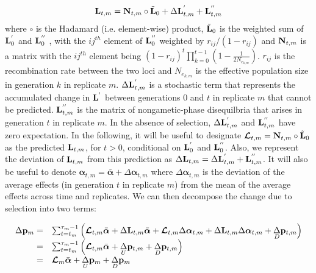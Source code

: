 \documentclass[12pt]{article}
\begin{document}
\begin{bibunit}
\begin{equation}
{\bf L}_{t,m}= {\bf N}_{t,m}\circ\tilde{\bf L}_{0}+\Delta{\bf L}^{'}_{t,m}+{\bf L}^{''}_{t,m}
\label{Eq:LD_dynamics}
\end{equation}
where $\circ$ is the Hadamard (i.e. element-wise) product, $\tilde{\bf L}_{0}$ is the weighted sum of ${\bf L}^{'}_{0}$ and ${\bf L}^{''}_{0}$ , with the $ij^{th}$ element of ${\bf L}^{''}_{0}$ weighted by $r_{ij}/(1-r_{ij})$ and ${\bf N}_{t,m}$ is a matrix with the $ij^{th}$ element being $(1-r_{ij})^{t}\prod_{k=0}^{t-1}(1-\frac{1}{2N_{e_{k,m}}})$. $r_{ij}$ is the recombination rate between the two loci and  $N_{e_{k,m}}$ is the effective population size in generation $k$ in replicate $m$. $\Delta {\bf L}^{'}_{t,m}$ is a stochastic term that represents the accumulated change in ${\bf L}^{'}$ between generations 0 and $t$ in replicate $m$ that cannot be predicted. ${\bf L}^{''}_{t,m}$ is the matrix of nongametic-phase disequilbria that arises in generation $t$ in replicate $m$. In the absence of selection, $\Delta {\bf L}^{'}_{t,m}$ and ${\bf L}^{''}_{t,m}$ have zero expectation. In the following, it will be useful to designate $\boldsymbol{\mathcal{L}}_{t,m} = {\bf N}_{t,m}\circ\tilde{\bf L}_0$ as the predicted ${\bf L}_{t,m}$, for $t>0$, conditional on ${\bf L}^{'}_{0}$ and ${\bf L}^{''}_{0}$. Also, we represent the deviation of ${\bf L}_{t,m}$ from this prediction as $\Delta {\bf L}_{t,m}=\Delta {\bf L}^{'}_{t,m}+{\bf L}^{''}_{t,m}$. It will also be useful to denote $\boldsymbol{\alpha}_{t,m}=\bar{\boldsymbol{\alpha}}+\Delta\boldsymbol{\alpha}_{t,m}$ where $\Delta\boldsymbol{\alpha}_{t,m}$ is the deviation of the average effects (in generation $t$ in replicate $m$) from the mean of the average effects across time and replicates.  We can then decompose the change due to selection into two terms:

\begin{equation}
\begin{array}{rl}
\Delta {\bf p}_m
=& \sum_{t=t_m}^{\tau_m-1} \left(\boldsymbol{\mathcal{L}}_{t,m}\bar{\boldsymbol{\alpha}}+\Delta{\bf L}_{t,m}\bar{\boldsymbol{\alpha}}+\boldsymbol{\mathcal{L}}_{t,m}\Delta\boldsymbol{\alpha}_{t,m}+\Delta{\bf L}_{t,m}\Delta\boldsymbol{\alpha}_{t,m}+\underset{D}\Delta {\bf p}_{t, m}\right)\\
=& \sum_{t=t_m}^{\tau_m-1} \left(\boldsymbol{\mathcal{L}}_{t,m}\bar{\boldsymbol{\alpha}}+\underset{U}\Delta {\bf p}_{t, m}+\underset{D}\Delta {\bf p}_{t, m}\right)\\
=&\boldsymbol{\mathcal{L}}_{m}\bar{\boldsymbol{\alpha}}+\underset{U}\Delta {\bf p}_{m}+\underset{D}\Delta {\bf p}_{m}\\
\end{array}
\label{Eq:dp}
\end{equation}


\end{bibunit}
\end{document}
